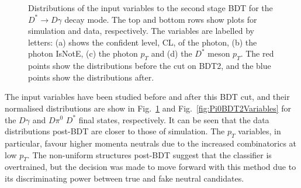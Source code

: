 \documentclass[oneside,12pt]{article}
\begin{document}
\begin{figure}[H]
\caption{\small{Distributions of the input variables to the second stage BDT for
the $D^* \rightarrow D\gamma$ decay mode. The top and bottom rows show plots for
simulation and data, respectively. The variables are labelled by letters: (a)
shows the confident level, CL, of the photon, (b) the photon IsNotE, (c) the
photon $p_T$ and (d) the $D^*$ meson $p_T$. The red points show the
distributions before the cut on BDT2, and the blue points show the distributions
after.}} \label{fig:GammaBDT2Variables}
\end{figure}

The input variables have been studied before and after this BDT cut, and their
normalised distributions are show in Fig.~\ref{fig:GammaBDT2Variables} and
Fig.~\ref{fig:Pi0BDT2Variables} for the $D\gamma$ and $D\pi^0$ $D^*$ final
states, respectively. It can be seen that the data distributions post-BDT are
closer to those of simulation.  The $p_T$ variables, in particular, favour
higher momenta neutrals due to the increased combinatorics at low $p_T$. The
non-uniform structures post-BDT suggest that the classifier is overtrained, but
the decision was made to move forward with this method due to its discriminating
power between true and fake neutral candidates.
\end{document}
